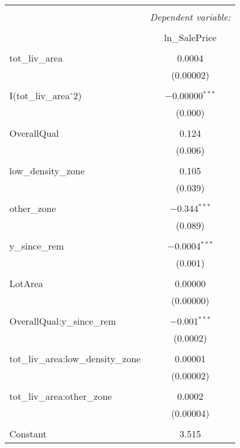 \documentclass{article}
\begin{document}
\begin{table}[!htbp] \centering 
  \caption{} 
  \label{} 
\begin{tabular}{@{\extracolsep{5pt}}lc} 
\\[-1.8ex]\hline 
\hline \\[-1.8ex] 
 & \multicolumn{1}{c}{\textit{Dependent variable:}} \\ 
\cline{2-2} 
\\[-1.8ex] & ln\_SalePrice \\ 
\hline \\[-1.8ex] 
 tot\_liv\_area & 0.0004 \\ 
  & (0.00002) \\ 
  & \\ 
 I(tot\_liv\_area$\hat{\mkern6mu}$2) & $-$0.00000$^{***}$ \\ 
  & (0.000) \\ 
  & \\ 
 OverallQual & 0.124 \\ 
  & (0.006) \\ 
  & \\ 
 low\_density\_zone & 0.105 \\ 
  & (0.039) \\ 
  & \\ 
 other\_zone & $-$0.344$^{***}$ \\ 
  & (0.089) \\ 
  & \\ 
 y\_since\_rem & $-$0.0004$^{***}$ \\ 
  & (0.001) \\ 
  & \\ 
 LotArea & 0.00000 \\ 
  & (0.00000) \\ 
  & \\ 
 OverallQual:y\_since\_rem & $-$0.001$^{***}$ \\ 
  & (0.0002) \\ 
  & \\ 
 tot\_liv\_area:low\_density\_zone & 0.00001 \\ 
  & (0.00002) \\ 
  & \\ 
 tot\_liv\_area:other\_zone & 0.0002 \\ 
  & (0.00004) \\ 
  & \\ 
 Constant & 3.515 \\ 

\end{tabular}
\end{table}
\end{document}
